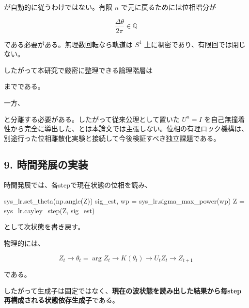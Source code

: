 \documentclass[
  a4paper,
]{ltjsarticle}
\newenvironment{Shaded}{}{}
\newcommand{\NormalTok}[1]{#1}
\newcommand{\OperatorTok}[1]{\textcolor[rgb]{0.40,0.40,0.40}{#1}}
\begin{document}
が自動的に従うわけではない。有限 \(n\) で元に戻るためには位相増分が

\[
\frac{\Delta\theta}{2\pi}\in\mathbb Q
\]

である必要がある。無理数回転なら軌道は \(S^1\)
上に稠密であり、有限回では閉じない。

したがって本研究で厳密に整理できる論理階層は

\begin{center}\end{center}

までである。

一方、

\begin{center}\end{center}

と分離する必要がある。したがって従来公理として置いた \(U^n=I\)
を自己無撞着性から完全に導出した、とは本論文では主張しない。位相の有理ロック機構は、別途行った位相離散化実験と接続して今後検証すべき独立課題である。

\subsection{9.
時間発展の実装}\label{ux6642ux9593ux767aux5c55ux306eux5b9fux88c5}

時間発展では、各stepで現在状態の位相を読み、

\begin{Shaded}
\begin{Highlighting}[]
\NormalTok{sys\_lr.set\_theta(np.angle(Z))}
\NormalTok{sig\_est, wp }\OperatorTok{=}\NormalTok{ sys\_lr.sigma\_max\_power(wp)}
\NormalTok{Z }\OperatorTok{=}\NormalTok{ sys\_lr.cayley\_step(Z, sig\_est)}
\end{Highlighting}
\end{Shaded}

として次状態を書き戻す。

物理的には、

\[
Z_t
\rightarrow
\theta_t=\arg Z_t
\rightarrow
K(\theta_t)
\rightarrow
U_t Z_t
\rightarrow
Z_{t+1}
\]

である。

したがって生成子は固定ではなく、\textbf{現在の波状態を読み出した結果から毎step再構成される状態依存生成子}である。
\end{document}
